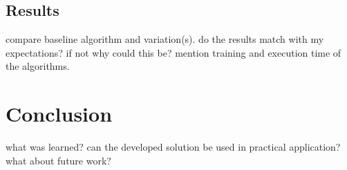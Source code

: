 \documentclass{scrartcl} %
\begin{document}
\subsection{Results}
compare baseline algorithm and variation(s). do the results match with my expectations? if not why could
this be? mention training and execution time of the algorithms. 

\section{Conclusion}
what was learned? can the developed solution be used in practical application? what about future work?



\end{document}
